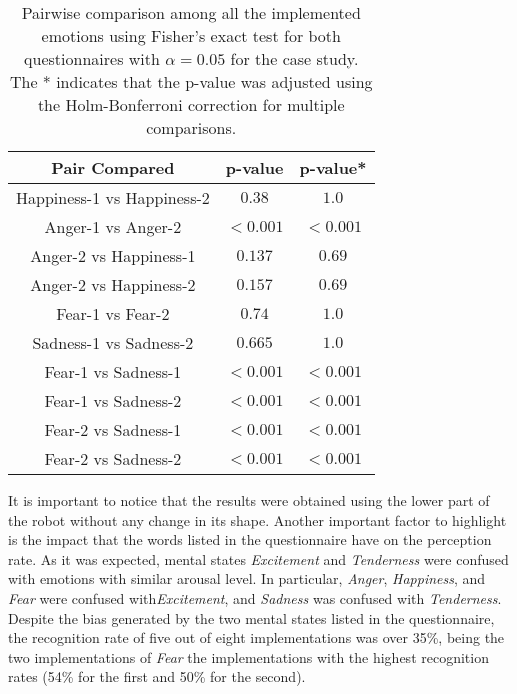 \begin{table}
\centering
\small
\caption{Pairwise comparison among all the implemented emotions using Fisher's exact test for both questionnaires with $\alpha = 0.05$ for the  case study. The * indicates that the p-value was adjusted using the Holm-Bonferroni correction for multiple comparisons.}
		\label{table:result_compare_fourth}
		\begin{tabular}{|c|c|c|}
			\hline	
\textbf{Pair Compared} & \textbf{p-value} & \textbf{p-value*}\\	
			\hline
			Happiness-1 vs Happiness-2 &$0.38$&$1.0$\\
			\hline
			Anger-1 vs Anger-2 & $<0.001$ 
			& $<0.001$
			\\
			\hline
			Anger-2 vs Happiness-1 & $0.137$&$0.69$\\
			\hline
			Anger-2 vs Happiness-2 & $0.157$&$0.69$\\
			\hline
			Fear-1 vs Fear-2 & $0.74$&$1.0$\\
			\hline
			Sadness-1 vs Sadness-2 & $0.665$&$1.0$\\
			\hline
			Fear-1 vs Sadness-1& $<0.001$ 
			& $<0.001$
			\\
			\hline
			Fear-1 vs Sadness-2 & $<0.001$
			& $<0.001$
			\\
			\hline
			Fear-2 vs Sadness-1 & $<0.001$
			& $<0.001$
			\\
			\hline
			Fear-2 vs Sadness-2 & $<0.001$
			& $<0.001$
			\\
			\hline
			\end{tabular}
\end{table}  

It is important to notice that the results were obtained using the lower part of the robot without any change in its shape. Another important factor to highlight is the impact that the words listed in the questionnaire have on the perception rate. As it was expected, mental states \textit{Excitement} and \textit{Tenderness} were confused with emotions with similar arousal level. In particular, \textit{Anger}, \textit{Happiness}, and \textit{Fear} were confused with\textit{Excitement}, and \textit{Sadness} was confused with \textit{Tenderness}. Despite the bias generated by the two mental states listed in the questionnaire, the recognition rate of five out of eight implementations was over 35\%, being the two implementations of \textit{Fear} the implementations with the highest recognition rates (54\% for the first and 50\% for the second).

